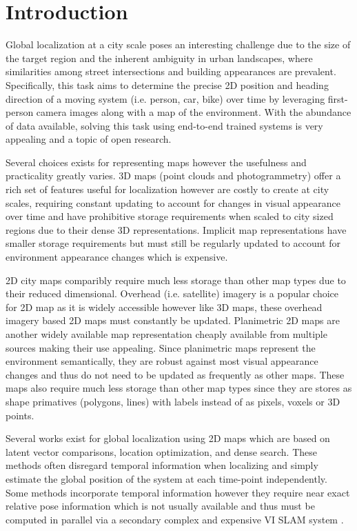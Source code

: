 \section{Introduction}



    Global localization at a city scale poses an interesting challenge due to the size of the target region and the inherent ambiguity in urban landscapes, where similarities among street intersections and building appearances are prevalent.   
    Specifically, this task aims to determine the precise 2D position and heading direction of a moving system (i.e. person, car, bike) over time by leveraging first-person camera images along with a map of the environment. With the abundance of data available, solving this task using end-to-end trained systems is very appealing and a topic of open research.


    

    Several choices exists for representing maps however the usefulness and practicality greatly varies. 3D maps (point clouds and photogrammetry) offer a rich set of features useful for localization however are costly to create at city scales, requiring constant updating to account for changes in visual appearance over time and have prohibitive storage requirements when scaled to city sized regions due to their dense 3D representations.  Implicit map representations  have smaller storage requirements but must still be regularly updated to account for environment appearance changes which is expensive. 
    
    2D city maps comparibly require much less storage than other map types due to their reduced dimensional.  Overhead (i.e. satellite) imagery is a popular choice for 2D map as it is widely accessible however like 3D maps, these overhead imagery based 2D maps must constantly be updated. Planimetric 2D maps are another widely available map representation cheaply available from multiple sources making their use appealing. Since planimetric maps represent the environment semantically, they are robust against most visual appearance changes and thus do not need to be updated as frequently as other maps.  These maps also require much less storage than other map types since they are stores as shape primatives (polygons, lines) with labels instead of as pixels, voxels or 3D points. 
       
    Several works  exist for global localization using 2D maps which are based on latent vector comparisons, location optimization, and dense search. These methods often disregard temporal information when localizing and simply estimate the global position of the system at each time-point independently. Some methods incorporate temporal information however they require near exact relative pose information which is not usually available and thus must be computed in parallel via a secondary complex and expensive VI SLAM system .

